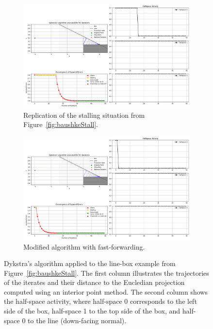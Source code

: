 \documentclass[hidelinks]{article}
\begin{document}
\begin{figure}[h]
    \centering
    \begin{subfigure}[t]{\textwidth}
        \centering
        \includegraphics[width=1\textwidth]{Latex/Current Version/Figures/stalling_notfixed_situation_2.png}
        \caption{Replication of the stalling situation from Figure~\ref{fig:baushkeStall}.}
        \label{fig:stalling2}
    \end{subfigure}
    \begin{subfigure}[t]{\textwidth}
        \centering
        \includegraphics[width=1\textwidth]{Latex/Current Version/Figures/stalling_fixed_situation_2.png}
        \caption{Modified algorithm with fast-forwarding.}
        \label{fig:fastforwarding}
    \end{subfigure}
    \caption{Dykstra's algorithm applied to the line-box example from Figure~\ref{fig:baushkeStall}. The first column illustrates the trajectories of the iterates and their distance to the Eucledian projection computed using an interior point method. The second column shows the half-space activity, where half-space 0 corresponds to the left side of the box, half-space 1 to the top side of the box, and half-space 0 to the line (down-facing normal).}
    \label{fig:stallingfixed}
\end{figure}
\end{document}
